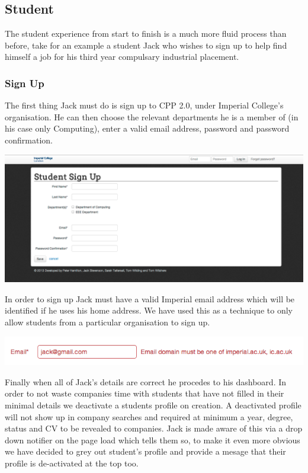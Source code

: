 \subsection{Student}
The student experience from start to finish is a much more fluid process than before, take for an example a student Jack who wishes to sign up to help find himself a job for his third year compulsary industrial placement.
  \subsubsection{Sign Up}
    The first thing Jack must do is sign up to CPP 2.0, under Imperial College's organisation. He can then choose the relevant departments he is a member of (in his case only Computing), enter a valid email address, password and password confirmation.

    \includegraphics[scale=0.3]{images/user_experiences/student/sign_up_page}

    In order to sign up Jack must have a valid Imperial email address which will be identified if he uses his home address. We have used this as a technique to only allow students from a particular organisation to sign up.

    \includegraphics[scale=0.5]{images/user_experiences/student/invalid_email}

    Finally when all of Jack's details are correct he procedes to his dashboard. In order to not waste companies time with students that have not filled in their minimal details we deactivate a students profile on creation. A deactivated profile will not show up in company searches and required at minimum a year, degree, status and CV to be revealed to companies. 
    Jack is made aware of this via a drop down notifier on the page load which tells them so, to make it even more obvious we have decided to grey out student's profile and provide a mesage that their profile is de-activated at the top too.

